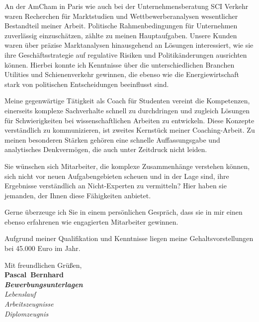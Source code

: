 \documentclass[11pt,a4paper]{article}
\def\firstname{Pascal}
\def\familyname{Bernhard}
\begin{document}
An der AmCham in Paris wie auch bei der Unternehmensberatung SCI Verkehr waren Recherchen für Marktstudien und Wettbewerberanalysen wesentlicher Bestandteil meiner Arbeit. Politische Rahmenbedingungen für Unternehmen zuverlässig einzuschätzen, zählte zu meinen Hauptaufgaben. Unsere Kunden waren über präzise Marktanalysen hinausgehend an Lösungen interessiert, wie sie ihre Geschäftsstrategie auf regulative Risiken und Politikänderungen ausrichten können. Hierbei konnte ich Kenntnisse über die unterschiedlichen Branchen Utilities und Schienenverkehr gewinnen, die ebenso wie die Energiewirtschaft stark von politischen Entscheidungen beeinflusst sind. 


Meine gegenwärtige Tätigkeit als Coach für Studenten vereint die Kompetenzen, einerseits komplexe Sachverhalte schnell zu durchdringen und zugleich Lösungen für Schwierigkeiten bei wissenschaftlichen Arbeiten zu entwickeln. Diese Konzepte verständlich zu kommunizieren, ist zweites Kernstück meiner Coaching-Arbeit. Zu meinen besonderen Stärken gehören eine schnelle Auffassungsgabe und analytisches Denkvermögen, die auch unter Zeitdruck nicht leiden.


Sie wünschen sich Mitarbeiter, die komplexe Zusammenhänge verstehen können, sich nicht vor neuen Aufgabengebieten scheuen und in der Lage sind, ihre Ergebnisse verständlich an Nicht-Experten zu vermitteln? Hier haben sie jemanden, der Ihnen diese Fähigkeiten anbietet.

Gerne überzeuge ich Sie in einem persönlichen Gespräch, dass sie in mir einen ebenso erfahrenen wie engagierten Mitarbeiter gewinnen.

Aufgrund meiner Qualifikation und Kenntnisse liegen meine Gehaltsvorstellungen bei 45.000 Euro im Jahr.


  
Mit freundlichen Grüßen,\\[3em] %
%
{\bfseries \firstname~\familyname}\\
%
\vfill%
{\slshape \bfseries Bewerbungsunterlagen}\\
 {\slshape Lebenslauf\\
 Arbeitszeugnisse\\
 Diplomzeugnis{}}
\end{document}
